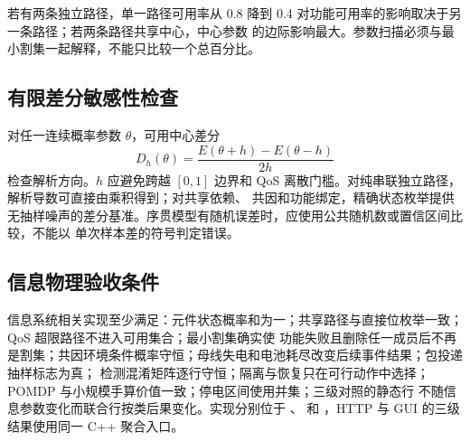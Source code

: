 若有两条独立路径，单一路径可用率从 0.8 降到 0.4 对功能可用率的影响取决于另一条路径；若两条路径共享中心，中心参数
的边际影响最大。参数扫描必须与最小割集一起解释，不能只比较一个总百分比。

\subsection{有限差分敏感性检查}
对任一连续概率参数 $\theta$，可用中心差分
\begin{equation}
 D_h(\theta)=\frac{E(\theta+h)-E(\theta-h)}{2h}
\end{equation}
检查解析方向。$h$ 应避免跨越 $[0,1]$ 边界和 QoS 离散门槛。对纯串联独立路径，解析导数可直接由乘积得到；对共享依赖、
共因和功能绑定，精确状态枚举提供无抽样噪声的差分基准。序贯模型有随机误差时，应使用公共随机数或置信区间比较，不能以
单次样本差的符号判定错误。

\subsection{信息物理验收条件}
信息系统相关实现至少满足：元件状态概率和为一；共享路径与直接位枚举一致；QoS 超限路径不进入可用集合；最小割集确实使
功能失败且删除任一成员后不再是割集；共因环境条件概率守恒；母线失电和电池耗尽改变后续事件结果；包投递抽样标志为真；
检测混淆矩阵逐行守恒；隔离与恢复只在可行动作中选择；POMDP 与小规模手算价值一致；停电区间使用并集；三级对照的静态行
不随信息参数变化而联合行按类后果变化。实现分别位于
、
 和
，HTTP 与 GUI 的三级结果使用同一 C++ 聚合入口。
